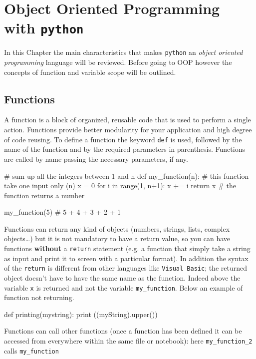 \chapter{Object Oriented Programming with \texttt{python}}
\label{ch:oop}

In this Chapter the main characteristics that makes \texttt{python} an \textit{object oriented programming} language will be reviewed. Before going to OOP however the concepts of function and variable scope will be outlined.

\section{Functions}
\label{functions}

A function is a block of organized, reusable code that is used to perform a single action. Functions provide better modularity for your application and high degree of code reusing. To define a function the keyword \texttt{def} is used, followed by the name of the function and by the required parameters in parenthesis. Functions are called by name passing the necessary parameters, if any.

\begin{ipython}
# sum up all the integers between 1 and n
def my_function(n): # this function take one input only (n)
    x = 0
    for i in range(1, n+1):
        x += i
    return x # the function returns a number

my_function(5) # 5 + 4 + 3 + 2 + 1
\end{ipython}

Functions can return any kind of objects (numbers, strings, lists, complex objects\ldots) 
but it is not mandatory to have a return value, so you can have functions \textbf{without} 
a \texttt{return} statement (e.g. a function that simply take a string as input and print it 
to screen with a particular format).
In addition the syntax of the \texttt{return} is different from other languages like 
\texttt{Visual\ Basic}; the returned object doesn't have to have the same name as the function. 
Indeed above the variable \texttt{x} is returned and not the variable \texttt{my\_function}. 
Below an example of function not returning.

\begin{ipython}
def printing(mystring):
    print ((myString).upper())
\end{ipython}

Functions can call other functions (once a function has been defined it can be accessed 
from everywhere within the same file or notebook): here \texttt{my\_function\_2} calls \texttt{my\_function}

